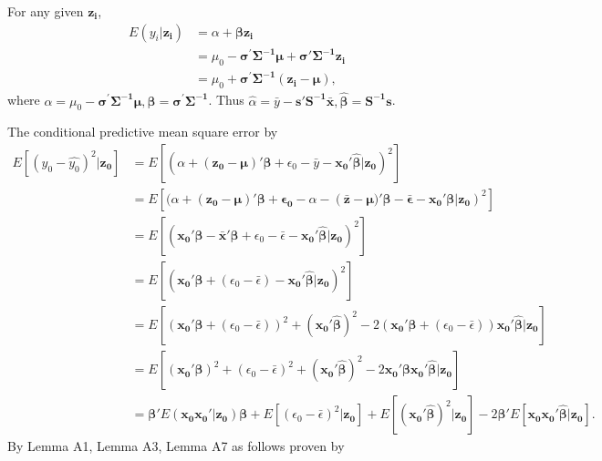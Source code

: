 For any given $\boldsymbol{z_i}$, 
$$\begin{aligned}
E(y_i|\boldsymbol{z_i})&=\alpha + \boldsymbol{\beta z_i}\\
&= \mu_{0}-\boldsymbol{\sigma^{'}\Sigma^{-1}\mu} + \boldsymbol{\sigma'\Sigma^{-1}z_i}\\
&=\mu_0+\boldsymbol{\sigma^{'}\Sigma^{-1}(z_i-\mu)},
\end{aligned}$$
where $\alpha=\mu_{0}-\boldsymbol{\sigma^{'}\Sigma^{-1}\mu}, \boldsymbol{\beta=\sigma^{'}\Sigma^{-1}}$. Thus $\hat{\alpha}=\bar{y}-\boldsymbol{s'S^{-1}\bar{x}},\boldsymbol{\hat{\beta}}=\boldsymbol{S^{-1}s}$.


The conditional predictive mean square error by 
$$\begin{aligned}
E[(y_0-\hat{y_0})^2|\boldsymbol{z_0}]
&=E[(\alpha+\boldsymbol{(z_0-\mu)'\beta}+\epsilon_0-\bar{y}-\boldsymbol{x_{0}'\hat{\beta}}|\boldsymbol{z_0})^2]\\
&=E[(\alpha+\boldsymbol{(z_0-\mu)'\beta+\epsilon_0}-\alpha-(\boldsymbol{\bar{z}-\mu)'\beta-\bar{\epsilon}-x_0'\beta|z_0})^2]\\&=E[(\boldsymbol{x_{0}'\beta}-\boldsymbol{\bar{x}'\beta}+\epsilon_0-\bar{\epsilon}-\boldsymbol{x_{0}'\hat{\beta}}|\boldsymbol{z_0})^2]\\
&=E[(\boldsymbol{x_{0}'\beta}+(\epsilon_0-\bar{\epsilon})-\boldsymbol{x_{0}'\hat{\beta}}|\boldsymbol{z_0})^2]\\
&=E[(\boldsymbol{x_0'\beta}+(\epsilon_0-\bar{\epsilon}))^2+(\boldsymbol{x_0'\hat{\beta}})^2-2(\boldsymbol{x_0'\beta}+(\epsilon_0-\bar{\epsilon}))\boldsymbol{x_0'\hat{\beta}}|\boldsymbol{z_0}]\\
&=E[(\boldsymbol{x_0'\beta})^2+(\epsilon_0-\bar{\epsilon})^2+(\boldsymbol{x_0'\hat{\beta}})^2
-2\boldsymbol{x_0'\beta x_0'\hat{\beta}}|\boldsymbol{z_0}]\\
&=\boldsymbol{\beta'}E(\boldsymbol{x_0x_0'}|\boldsymbol{z_0})\boldsymbol{\beta}+E[(\epsilon_0-\bar{\epsilon})^2|\boldsymbol{z_0}]+E[(\boldsymbol{x_0'\hat{\beta}})^2|\boldsymbol{z_0}]-2\boldsymbol{\beta'}E[\boldsymbol{x_0x_0'\hat{\beta}}|\boldsymbol{z_0}].
\end{aligned}$$
By Lemma A1, Lemma A3, Lemma A7 as follows proven by \cite{narula1974predictive}
